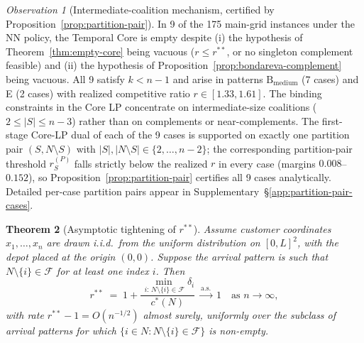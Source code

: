 \documentclass[11pt]{article}
\theoremstyle{plain}
\newtheorem{theorem}{Theorem}
\theoremstyle{definition}
\theoremstyle{remark}
\newtheorem{observation}[theorem]{Observation}
\newcommand{\F}{\mathcal{F}}
\newcommand{\cstar}{c^{\ast}}
\begin{document}
\begin{observation}[Intermediate-coalition mechanism, certified by Proposition~\ref{prop:partition-pair}]
\label{obs:intermediate}
In 9 of the 175 main-grid instances under the NN policy, the Temporal Core is empty despite (i) the hypothesis of Theorem~\ref{thm:empty-core} being vacuous ($r\le r^{\ast\ast}$, or no singleton complement feasible) and (ii) the hypothesis of Proposition~\ref{prop:bondareva-complement} being vacuous. All 9 satisfy $k<n-1$ and arise in patterns $\text{B}_{\text{medium}}$ (7 cases) and E (2 cases) with realized competitive ratio $r\in[1.33,1.61]$. The binding constraints in the Core LP concentrate on intermediate-size coalitions ($2\le |S|\le n-3$) rather than on complements or near-complements. The first-stage Core-LP dual of each of the 9 cases is supported on exactly one partition pair $(S,N\setminus S)$ with $|S|,|N\setminus S|\in\{2,\ldots,n-2\}$; the corresponding partition-pair threshold $r^{(P)}_{S}$ falls strictly below the realized $r$ in every case (margins $0.008$--$0.152$), so Proposition~\ref{prop:partition-pair} certifies all 9 cases analytically. Detailed per-case partition pairs appear in Supplementary~\S\ref{app:partition-pair-cases}.
\end{observation}

\begin{theorem}[Asymptotic tightening of $r^{\ast\ast}$]
\label{thm:asymptotic}
Assume customer coordinates $x_1,\ldots,x_n$ are drawn i.i.d.\ from the uniform distribution on $[0,L]^2$, with the depot placed at the origin $(0,0)$. Suppose the arrival pattern is such that $N\setminus\{i\}\in\F$ for at least one index $i$. Then
\[
r^{\ast\ast} \;=\; 1 + \frac{\min_{\,i:\,N\setminus\{i\}\in\F} \delta_i}{\cstar(N)}\;\xrightarrow{\text{a.s.}}\; 1 \quad \text{as } n\to\infty,
\]
with rate $r^{\ast\ast}-1 = O(n^{-1/2})$ almost surely, uniformly over the subclass of arrival patterns for which $\{i \in N : N\setminus\{i\}\in\F\}$ is non-empty.
\end{theorem}
\end{document}
